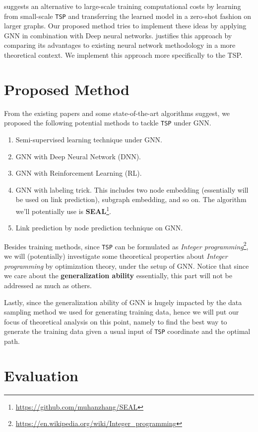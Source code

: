 \documentclass{article}
\begin{document}
\cite{joshi2021learning} suggests an alternative to large-scale training computational costs by learning from small-scale \texttt{TSP} and transferring the learned model in a zero-shot
fashion on larger graphs. Our proposed method tries to implement these ideas by applying GNN in combination with Deep neural networks. \cite{almasan2020deep} justifies this approach by
comparing its advantages to existing neural network methodology in a more theoretical context. We implement this approach more specifically to the TSP.

\section{Proposed Method}\label{proposed}
From the existing papers and some state-of-the-art algorithms suggest, we proposed the following potential methods to tackle \texttt{TSP} under GNN.
\begin{enumerate}
  \item Semi-supervised learning technique under GNN.
  \item GNN with Deep Neural Network (DNN).
  \item GNN with Reinforcement Learning (RL).
  \item GNN with labeling trick\cite{zhang2022labeling}. This includes two node embedding (essentially will be used on link prediction),
        subgraph embedding, and so on. The algorithm we'll potentially use is \textbf{SEAL}\footnote{\url{https://github.com/muhanzhang/SEAL}}.
  \item Link prediction by node prediction technique on GNN.
\end{enumerate}

Besides training methods, since \texttt{TSP} can be formulated as \emph{Integer programming}\footnote{\url{https://en.wikipedia.org/wiki/Integer_programming}},
we will (potentially) investigate some theoretical properties about \emph{Integer programming} by optimization theory, under the setup of GNN. Notice that since we
care about the \textbf{generalization ability} essentially, this part will not be addressed as much as others.

Lastly, since the generalization ability of GNN is hugely impacted by the data sampling method we used for generating training data, hence we will put our focus of
theoretical analysis on this point, namely to find the best way to generate the training data given a usual input of \texttt{TSP} coordinate and the optimal path.

\section{Evaluation}\label{evaluation}
\end{document}
